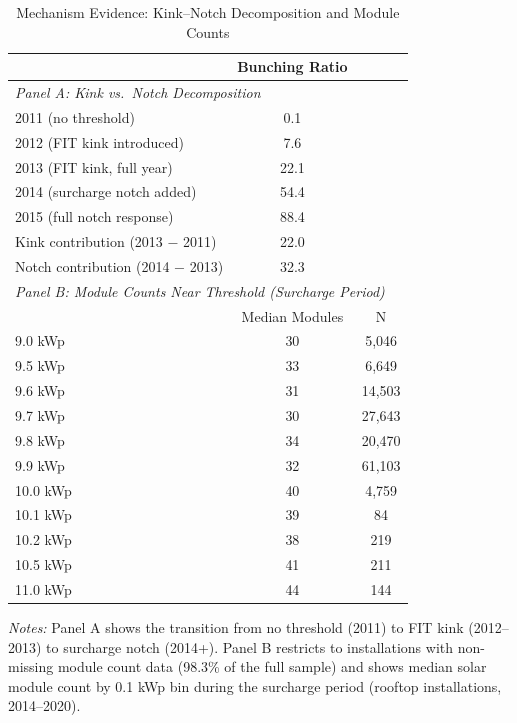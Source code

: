 \begin{table}[t]
\centering
\caption{Mechanism Evidence: Kink--Notch Decomposition and Module Counts}
\label{tab:mechanism}
\begin{tabular}{lcc}
\toprule
 & Bunching Ratio & \\
\midrule
\multicolumn{3}{l}{\textit{Panel A: Kink vs.\ Notch Decomposition}} \\
2011 (no threshold) & 0.1 & \\
2012 (FIT kink introduced) & 7.6 & \\
2013 (FIT kink, full year) & 22.1 & \\
2014 (surcharge notch added) & 54.4 & \\
2015 (full notch response) & 88.4 & \\
\midrule
Kink contribution (2013 $-$ 2011) & 22.0 & \\
Notch contribution (2014 $-$ 2013) & 32.3 & \\
\midrule
\multicolumn{3}{l}{\textit{Panel B: Module Counts Near Threshold (Surcharge Period)}} \\
 & Median Modules & N \\
\midrule
9.0 kWp & 30 & 5,046 \\
9.5 kWp & 33 & 6,649 \\
9.6 kWp & 31 & 14,503 \\
9.7 kWp & 30 & 27,643 \\
9.8 kWp & 34 & 20,470 \\
9.9 kWp & 32 & 61,103 \\
10.0 kWp & 40 & 4,759 \\
10.1 kWp & 39 & 84 \\
10.2 kWp & 38 & 219 \\
10.5 kWp & 41 & 211 \\
11.0 kWp & 44 & 144 \\
\bottomrule
\end{tabular}
\begin{flushleft}\small \textit{Notes:} Panel A shows the transition from no threshold (2011) to FIT kink (2012--2013) to surcharge notch (2014+). Panel B restricts to installations with non-missing module count data (98.3\% of the full sample) and shows median solar module count by 0.1 kWp bin during the surcharge period (rooftop installations, 2014--2020).\end{flushleft}
\end{table}

